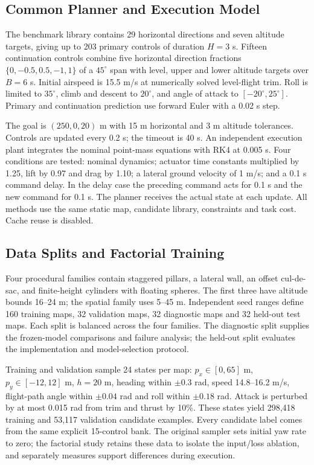 \documentclass[journal]{IEEEtran}
\begin{document}
\subsection{Common Planner and Execution Model}
The benchmark library contains 29 horizontal directions and seven altitude targets, giving up to 203 primary controls of duration $H=3$ s. Fifteen continuation controls combine five horizontal direction fractions $\{0,-0.5,0.5,-1,1\}$ of a $45^\circ$ span with level, upper and lower altitude targets over $B=6$ s. Initial airspeed is 15.5 m/s at numerically solved level-flight trim. Roll is limited to $35^\circ$, climb and descent to $20^\circ$, and angle of attack to $[-20^\circ,25^\circ]$. Primary and continuation prediction use forward Euler with a 0.02 s step.

The goal is $(250,0,20)$ m with 15 m horizontal and 3 m altitude tolerances. Controls are updated every 0.2 s; the timeout is 40 s. An independent execution plant integrates the nominal point-mass equations with RK4 at 0.005 s. Four conditions are tested: nominal dynamics; actuator time constants multiplied by 1.25, lift by 0.97 and drag by 1.10; a lateral ground velocity of 1 m/s; and a 0.1 s command delay. In the delay case the preceding command acts for 0.1 s and the new command for 0.1 s. The planner receives the actual state at each update. All methods use the same static map, candidate library, constraints and task cost. Cache reuse is disabled.

\subsection{Data Splits and Factorial Training}
Four procedural families contain staggered pillars, a lateral wall, an offset cul-de-sac, and finite-height cylinders with floating spheres. The first three have altitude bounds 16--24 m; the spatial family uses 5--45 m. Independent seed ranges define 160 training maps, 32 validation maps, 32 diagnostic maps and 32 held-out test maps. Each split is balanced across the four families. The diagnostic split supplies the frozen-model comparisons and failure analysis; the held-out split evaluates the implementation and model-selection protocol.

Training and validation sample 24 states per map: $p_x\in[0,65]$ m, $p_y\in[-12,12]$ m, $h=20$ m, heading within $\pm0.3$ rad, speed 14.8--16.2 m/s, flight-path angle within $\pm0.04$ rad and roll within $\pm0.18$ rad. Attack is perturbed by at most 0.015 rad from trim and thrust by 10\%. These states yield 298,418 training and 53,117 validation candidate examples. Every candidate label comes from the same explicit 15-control bank. The original sampler sets initial yaw rate to zero; the factorial study retains these data to isolate the input/loss ablation, and separately measures support differences during execution.
\end{document}
